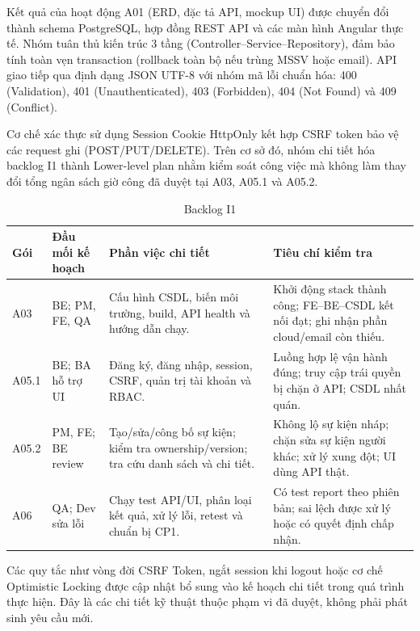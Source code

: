 
Kết quả của hoạt động A01 (ERD, đặc tả API, mockup UI) được chuyển đổi thành schema PostgreSQL, hợp đồng REST API và các màn hình Angular thực tế. Nhóm tuân thủ kiến trúc 3 tầng (Controller--Service--Repository), đảm bảo tính toàn vẹn transaction (rollback toàn bộ nếu trùng MSSV hoặc email). API giao tiếp qua định dạng JSON UTF-8 với nhóm mã lỗi chuẩn hóa: 400 (Validation), 401 (Unauthenticated), 403 (Forbidden), 404 (Not Found) và 409 (Conflict). 

Cơ chế xác thực sử dụng Session Cookie HttpOnly kết hợp CSRF token bảo vệ các request ghi (POST/PUT/DELETE). Trên cơ sở đó, nhóm chi tiết hóa backlog I1 thành Lower-level plan nhằm kiểm soát công việc mà không làm thay đổi tổng ngân sách giờ công đã duyệt tại A03, A05.1 và A05.2.

\begin{table}[H]
\centering\small
\caption{Backlog I1}\label{tab:i1-lower}
\begin{tabularx}{\linewidth}{@{}p{.10\linewidth}p{.20\linewidth}XX@{}}
\toprule
\textbf{Gói} & \textbf{Đầu mối kế hoạch} & \textbf{Phần việc chi tiết} & \textbf{Tiêu chí kiểm tra}\\\midrule
A03 & BE; PM, FE, QA & Cấu hình CSDL, biến môi trường, build, API health và hướng dẫn chạy. & Khởi động stack thành công; FE--BE--CSDL kết nối đạt; ghi nhận phần cloud/email còn thiếu.\\
A05.1 & BE; BA hỗ trợ UI & Đăng ký, đăng nhập, session, CSRF, quản trị tài khoản và RBAC. & Luồng hợp lệ vận hành đúng; truy cập trái quyền bị chặn ở API; CSDL nhất quán.\\
A05.2 & PM, FE; BE review & Tạo/sửa/công bố sự kiện; kiểm tra ownership/version; tra cứu danh sách và chi tiết. & Không lộ sự kiện nháp; chặn sửa sự kiện người khác; xử lý xung đột; UI dùng API thật.\\
A06 & QA; Dev sửa lỗi & Chạy test API/UI, phân loại kết quả, xử lý lỗi, retest và chuẩn bị CP1. & Có test report theo phiên bản; sai lệch được xử lý hoặc có quyết định chấp nhận.\\
\bottomrule
\end{tabularx}
\end{table}

Các quy tắc như vòng đời CSRF Token, ngắt session khi logout hoặc cơ chế Optimistic Locking được cập nhật bổ sung vào kế hoạch chi tiết trong quá trình thực hiện. Đây là các chi tiết kỹ thuật thuộc phạm vi đã duyệt, không phải phát sinh yêu cầu mới.

